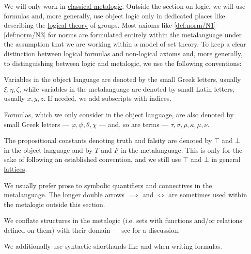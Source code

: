 \begin{remark}\label{rem:mathematical_logic_conventions}
  We will only work in \hyperref[def:classical_propositional_deductive_systems]{classical metalogic}. Outside the section on logic, we will use formulas and, more generally, use object logic only in dedicated places like  describing the \hyperref[def:first_order_theory]{logical theory} of groups. Most axioms like \ref{def:norm/N1}-\ref{def:norm/N3} for norms are formulated entirely within the metalanguage under the assumption that we are working within a model of set theory. To keep a clear distinction between logical formulas and non-logical axioms and, more generally, to distinguishing between logic and metalogic, we use the following conventions:

  \begin{thmenum}
     Variables in the object language are denoted by the small Greek letters, usually \( \xi, \eta, \zeta \), while variables in the metalanguage are denoted by small Latin letters, usually \( x, y, z \). If needed, we add subscripts with indices.

     Formulas, which we only consider in the object language, are also denoted by small Greek letters --- \( \varphi, \psi, \theta, \chi \) --- and, so are terms --- \( \tau, \sigma, \rho, \kappa, \mu, \nu \).

     The propositional constants denoting truth and falsity are denoted by \( \top \) and \( \bot \) in the object language and by \( T \) and \( F \) in the metalanguage. This is only for the sake of following an established convention, and we still use \( \top \) and \( \bot \) in general \hyperref[def:semilattice/lattice]{lattices}.

     We usually prefer prose to symbolic quantifiers and connectives in the metalanguage. The longer double arrows \( \implies \) and \( \iff \) are sometimes used within the metalogic outside this section.

     We conflate structures in the metalogic (i.e. sets with functions and/or relations defined on them) with their domain --- see  for a discussion.

     We additionally use syntactic shorthands like  and  when writing formulas.


\end{thmenum}
\end{remark}
